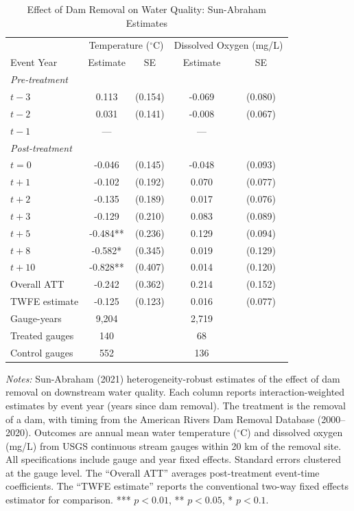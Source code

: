 \begin{table}[t]
\centering
\caption{Effect of Dam Removal on Water Quality: Sun-Abraham Estimates}
\label{tab:main}
\begin{tabular}{lcccc}
\hline\hline
 & \multicolumn{2}{c}{Temperature ($^{\circ}$C)} & \multicolumn{2}{c}{Dissolved Oxygen (mg/L)} \\
Event Year & Estimate & SE & Estimate & SE \\
\hline
\textit{Pre-treatment} \\
$t -3$ & 0.113 & (0.154) & -0.069 & (0.080) \\
$t -2$ & 0.031 & (0.141) & -0.008 & (0.067) \\
$t -1$ & --- &  & --- &  \\
\hline
\textit{Post-treatment} \\
$t = 0$ & -0.046 & (0.145) & -0.048 & (0.093) \\
$t + 1$ & -0.102 & (0.192) & 0.070 & (0.077) \\
$t + 2$ & -0.135 & (0.189) & 0.017 & (0.076) \\
$t + 3$ & -0.129 & (0.210) & 0.083 & (0.089) \\
$t + 5$ & -0.484** & (0.236) & 0.129 & (0.094) \\
$t + 8$ & -0.582* & (0.345) & 0.019 & (0.129) \\
$t + 10$ & -0.828** & (0.407) & 0.014 & (0.120) \\
\hline
Overall ATT & -0.242 & (0.362) & 0.214 & (0.152) \\
TWFE estimate & -0.125 & (0.123) & 0.016 & (0.077) \\
\hline
Gauge-years & 9,204 & & 2,719 & \\
Treated gauges & 140 & & 68 & \\
Control gauges & 552 & & 136 & \\
\hline\hline
\end{tabular}
\begin{tablenotes}
\small
\item \textit{Notes:} Sun-Abraham (2021) heterogeneity-robust estimates of the effect of dam removal on downstream water quality. Each column reports interaction-weighted estimates by event year (years since dam removal). The treatment is the removal of a dam, with timing from the American Rivers Dam Removal Database (2000--2020). Outcomes are annual mean water temperature ($^{\circ}$C) and dissolved oxygen (mg/L) from USGS continuous stream gauges within 20 km of the removal site. All specifications include gauge and year fixed effects. Standard errors clustered at the gauge level. The ``Overall ATT'' averages post-treatment event-time coefficients. The ``TWFE estimate'' reports the conventional two-way fixed effects estimator for comparison. *** $p<0.01$, ** $p<0.05$, * $p<0.1$.
\end{tablenotes}
\end{table}

